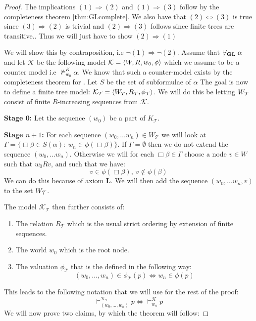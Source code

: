 \documentclass[../main.tex]{subfiles}
\begin{document}
\begin{proof}
	The implications $(1)\Rightarrow (2)$ and $(1)\Rightarrow(3)$ follow
	by the completeness theorem \ref{thm:GLcomplete}. We also have that $(2)\Leftrightarrow (3)$
	is true since $(3)\Rightarrow(2)$ is trivial and $(2)\Rightarrow(3)$
	follows since finite trees  are transitive.. Thus we will just have to show $(2)\Rightarrow(1)$

	We will show this by contraposition, i.e $\neg(1)\Rightarrow\neg(2)$.
	Assume that $\not\vdash_{\text{\textbf{GL}}}\alpha$ and
let $\mathcal{K}$ be the following model $\mathcal{K}=\langle W,R,w_0,\phi\rangle $
which we assume to be  a counter model i.e
	$\not\vDash_{w_0}^{K}\alpha$. We know that such a counter-model
	exists by the completeness theorem for \GL. Let $S$ be the set of subformulae of
	$\alpha$ The goal is now to define a finite tree
	model: $\mathcal{K}_{\mathcal{T}}=\langle
	W_T,R_{\mathcal{T}},\phi_{\mathcal{T}}\rangle$. We will do this be
	letting $W_{\mathcal{T}}$ consist of finite $R$-increasing sequences from
	$\mathcal{K}$.

	\textbf{Stage 0:} Let the sequence $(w_0)$ be a part of
	$K_{\mathcal{T}}$.

	\textbf{Stage $n+1$:} For each sequence $(w_0,\ldots w_n)\in
	W_{\mathcal{T}}$ we
	will look at $\Gamma=\{\Box\beta\in S(\alpha):\
	w_n\in\phi(\Box\beta)\}$.
	If $\Gamma=\emptyset$ then we do not extend the sequence $(w_0,\ldots
	w_n)$. Otherwise we will for each $\Box\beta\in\Gamma$ choose a node
	$v\in W$ such that $w_0Rv$, and such that we have:
	\[v\in\phi(\Box\beta),\ v\not\in\phi(\beta)\]
	We can do this because of axiom \textbf{L}. We will then add the sequence
	$(w_0,\ldots w_n,v)$ to the set $W_{\mathcal{T}}$.

	The model $\mathcal{K}_{\mathcal{T}}$ then further consists of:
	\begin{enumerate}
		\item The relation $R_{\mathcal{T}}$ which is the usual strict
	ordering by extension of finite sequences. 
		\item	The world $w_0$ which is the root node.
		\item The valuation $\phi_{\mathcal{T}}$ that is the defined in
		the following way:
		\[(w_0,\ldots,w_n)\in \phi_{\mathcal{T}}(p)\Leftrightarrow w_n\in\phi(p)\]
	\end{enumerate}
	This leads to the following notation that we will use for the rest
	of the proof:
	\[\vDash_{(w_0,\ldots,w_n)}^{\mathcal{K}_{\mathcal{T}}}p\Leftrightarrow\vDash_{w_n}^\mathcal{K}
	p\]
	We will now prove two claims, by which the theorem will follow:


\end{proof}
\end{document}
